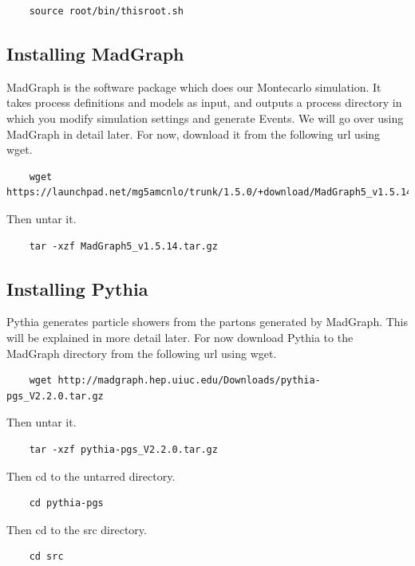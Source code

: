 \documentclass{article}
\begin{document}
\begin{verbatim}
	source root/bin/thisroot.sh
\end{verbatim}

\subsection{Installing MadGraph}

MadGraph is the software package which does our Montecarlo simulation. It takes
process definitions and models as input, and outputs a process directory in which
you modify simulation settings and generate Events. We will go over using MadGraph
in detail later. For now, download it from the following url using wget.

\begin{verbatim}
	wget https://launchpad.net/mg5amcnlo/trunk/1.5.0/+download/MadGraph5_v1.5.14.tar.gz
\end{verbatim}

Then untar it.

\begin{verbatim}
	tar -xzf MadGraph5_v1.5.14.tar.gz
\end{verbatim}

\subsection{Installing Pythia}

Pythia generates particle showers from the partons generated by MadGraph.
This will be explained in more detail later. For now download Pythia to the
MadGraph directory from the following url using wget.

\begin{verbatim}
	wget http://madgraph.hep.uiuc.edu/Downloads/pythia-pgs_V2.2.0.tar.gz
\end{verbatim}

Then untar it.

\begin{verbatim}
	tar -xzf pythia-pgs_V2.2.0.tar.gz
\end{verbatim}

Then cd to the untarred directory.

\begin{verbatim}
	cd pythia-pgs
\end{verbatim}

Then cd to the src directory.

\begin{verbatim}
	cd src
\end{verbatim}
\end{document}
